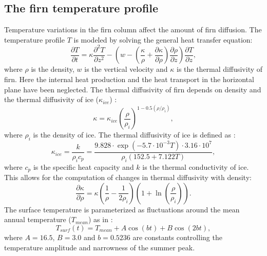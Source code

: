 \documentclass[11pt, draftcls, onecolumn]{IEEEtran} %
\numberwithin{equation}{section}
\numberwithin{table}{section}
\numberwithin{figure}{section}
\begin{document}
\begin{appendices}
\section{The firn temperature profile} \label{sec:firn_temp_profile}
Temperature variations in the firn column affect the amount of firn diffusion.  
The temperature profile $T$ is modeled by solving the general heat transfer equation:
\begin{equation} \label{eq:crank2}
\frac{\partial T}{\partial t} = \kappa\frac{\partial^2 T}{\partial z^2} - \left(w - \left( \frac{\kappa}{\rho}+ \frac{\partial \kappa}{\partial \rho}\right) \frac{\partial \rho}{\partial z}\right) \frac{\partial T}{\partial z},
\end{equation}
where $\rho$ is the density, $w$ is the vertical velocity and $\kappa$ is the thermal diffusivity of firn.
Here the internal heat production and the heat transport in the horizontal plane have been neglected.
The thermal diffusivity of firn depends on density and the thermal diffusivity of ice ($\kappa_{ice}$) \citep{Schwander1997}:
\begin{equation}
\kappa = \kappa_{ice}\left(\frac{\rho}{\rho_i}\right)^{1-0.5(\rho/\rho_i)},
\end{equation}
where $\rho_i$ is the density of ice.
The thermal diffusivity of ice is defined as \citep{Paterson}:
\begin{equation}
\kappa_{ice} = \frac{k}{\rho_i c_p} = \frac{9.828\cdot \exp(-5.7 \cdot 10^{-3}T)\cdot 3.16\cdot 10^7}{\rho_i(152.5 + 7.122T)},
\end{equation}
where $c_p$ is the specific heat capacity and $k$ is the thermal conductivity of ice.
This allows for the computation of changes in thermal diffusivity with density:
\begin{equation}
\frac{\partial \kappa}{\partial \rho}= \kappa \left(\frac{1}{\rho} -\frac{1}{2\rho_i}\right)\left(1 + \ln\left(\frac{\rho}{\rho_i}\right)\right).
\end{equation}
The surface temperature is parameterized as fluctuations around the mean annual temperature ($T_{mean}$) as in \cite{Simonsen2011}:
\begin{equation}
T_{surf}(t) = T_{mean} + A \cos\left(b t\right) + B \cos\left(2 b t\right),
\end{equation}
where $A = 16.5$, $B= 3.0$ and $b = 0.5236$ are constants controlling the temperature amplitude and narrowness of the summer peak.


\end{appendices}
\end{document}
